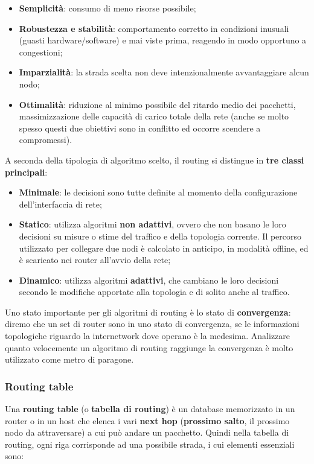 \documentclass{article}
\begin{document}
        \begin{itemize}
            \item \textbf{Semplicità}: consumo di meno risorse possibile;
            \item \textbf{Robustezza e stabilità}: comportamento corretto in condizioni inusuali (guasti
            hardware/software) e mai viste prima, reagendo in modo opportuno a congestioni;
            \item \textbf{Imparzialità}: la strada scelta non deve intenzionalmente avvantaggiare alcun nodo;
            \item \textbf{Ottimalità}: riduzione al minimo possibile del ritardo medio dei pacchetti,
            massimizzazione delle capacità di carico totale della rete (anche se molto spesso questi
            due obiettivi sono in conflitto ed occorre scendere a compromessi).
        \end{itemize}
        
        A seconda della tipologia di algoritmo scelto, il routing si distingue in \textbf{tre classi principali}:

        \begin{itemize}
            \item \textbf{Minimale}: le decisioni sono tutte definite al momento della configurazione
            dell’interfaccia di rete;
            \item \textbf{Statico}: utilizza algoritmi \textbf{non adattivi}, ovvero che non basano le loro decisioni su
            misure o stime del traffico e della topologia corrente. Il percorso utilizzato per collegare
            due nodi è calcolato in anticipo, in modalità offline, ed è scaricato nei router all’avvio
            della rete;
            \item \textbf{Dinamico}: utilizza algoritmi \textbf{adattivi}, che cambiano le loro decisioni secondo le
            modifiche apportate alla topologia e di solito anche al traffico.
        \end{itemize}

        Uno stato importante per gli algoritmi di routing è lo stato di \textbf{convergenza}: diremo che un set
        di router sono in uno stato di convergenza, se le informazioni topologiche riguardo la
        internetwork dove operano è la medesima. Analizzare quanto velocemente un algoritmo di
        routing raggiunge la convergenza è molto utilizzato come metro di paragone.

            \subsubsection{Routing table}
            Una \textbf{routing table} (o \textbf{tabella di routing}) è un database memorizzato in un router o in un host
            che elenca i vari \textbf{next hop} (\textbf{prossimo salto}, il prossimo nodo da attraversare) a cui può andare
            un pacchetto. Quindi nella tabella di routing, ogni riga corrisponde ad una possibile strada, i cui
            elementi essenziali sono:
            
\end{document}
